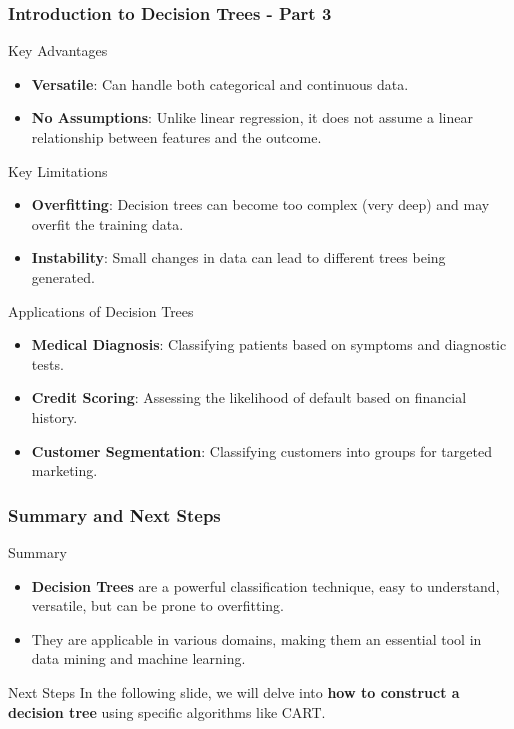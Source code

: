 \documentclass[aspectratio=169]{beamer}
\begin{document}
\begin{frame}[fragile]
    \frametitle{Introduction to Decision Trees - Part 3}
    \begin{block}{Key Advantages}
        \begin{itemize}
            \item \textbf{Versatile}: Can handle both categorical and continuous data.
            \item \textbf{No Assumptions}: Unlike linear regression, it does not assume a linear relationship between features and the outcome.
        \end{itemize}
    \end{block}

    \begin{block}{Key Limitations}
        \begin{itemize}
            \item \textbf{Overfitting}: Decision trees can become too complex (very deep) and may overfit the training data.
            \item \textbf{Instability}: Small changes in data can lead to different trees being generated.
        \end{itemize}
    \end{block}

    \begin{block}{Applications of Decision Trees}
        \begin{itemize}
            \item \textbf{Medical Diagnosis}: Classifying patients based on symptoms and diagnostic tests.
            \item \textbf{Credit Scoring}: Assessing the likelihood of default based on financial history.
            \item \textbf{Customer Segmentation}: Classifying customers into groups for targeted marketing.
        \end{itemize}
    \end{block}
\end{frame}

\begin{frame}[fragile]
    \frametitle{Summary and Next Steps}
    \begin{block}{Summary}
        \begin{itemize}
            \item \textbf{Decision Trees} are a powerful classification technique, easy to understand, versatile, but can be prone to overfitting.
            \item They are applicable in various domains, making them an essential tool in data mining and machine learning.
        \end{itemize}
    \end{block}

    \begin{block}{Next Steps}
        In the following slide, we will delve into \textbf{how to construct a decision tree} using specific algorithms like CART.
    \end{block}
\end{frame}
\end{document}
